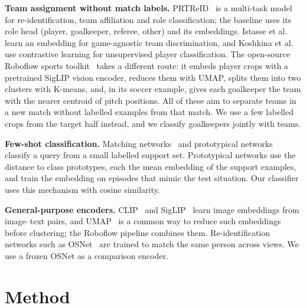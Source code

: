 \documentclass[10pt]{article}
\begin{document}
\textbf{Team assignment without match labels.} PRTReID~\cite{mansourian2024prtreid} is a multi-task model for re-identification, team affiliation and role classification; the baseline uses its role head (player, goalkeeper, referee, other) and its embeddings. Istasse et al.~\cite{istasse2019associative} learn an embedding for game-agnostic team discrimination, and Koshkina et al.~\cite{koshkina2021contrastive} use contrastive learning for unsupervised player classification. The open-source Roboflow sports toolkit~\cite{roboflow2025sports} takes a different route: it embeds player crops with a pretrained SigLIP vision encoder, reduces them with UMAP, splits them into two clusters with K-means, and, in its soccer example, gives each goalkeeper the team with the nearer centroid of pitch positions. All of these aim to separate teams in a new match without labelled examples from that match. We use a few labelled crops from the target half instead, and we classify goalkeepers jointly with teams.

\textbf{Few-shot classification.} Matching networks~\cite{vinyals2016matching} and prototypical networks~\cite{snell2017prototypical} classify a query from a small labelled support set. Prototypical networks use the distance to class prototypes, each the mean embedding of the support examples, and train the embedding on episodes that mimic the test situation. Our classifier uses this mechanism with cosine similarity.

\textbf{General-purpose encoders.} CLIP~\cite{radford2021clip} and SigLIP~\cite{zhai2023siglip} learn image embeddings from image--text pairs, and UMAP~\cite{mcinnes2018umap} is a common way to reduce such embeddings before clustering; the Roboflow pipeline combines them. Re-identification networks such as OSNet~\cite{zhou2019osnet} are trained to match the same person across views. We use a frozen OSNet as a comparison encoder.

\section{Method}
\label{sec:method}
\end{document}
